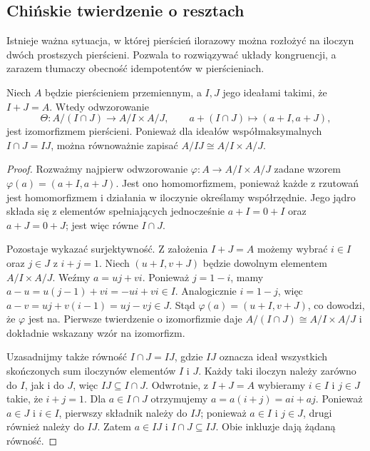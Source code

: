 \subsection{Chińskie twierdzenie o resztach}

Istnieje ważna sytuacja, w której pierścień ilorazowy można rozłożyć
na iloczyn dwóch prostszych pierścieni. Pozwala to rozwiązywać układy
kongruencji, a zarazem tłumaczy obecność idempotentów w pierścieniach.

\begin{twierdzenie}
\label{tw:crt}
Niech $A$ będzie pierścieniem przemiennym, a $I,J$ jego ideałami
takimi, że $I+J=A$. Wtedy odwzorowanie
\[
 \Theta\colon A/(I\cap J)\longrightarrow A/I\times A/J,\qquad
 a+(I\cap J)\longmapsto(a+I,a+J),
\]
jest izomorfizmem pierścieni. Ponieważ dla ideałów współmaksymalnych
$I\cap J=IJ$, można równoważnie zapisać $A/IJ\cong A/I\times A/J$.
\end{twierdzenie}
\begin{proof}
Rozważmy najpierw odwzorowanie
$\varphi\colon A\to A/I\times A/J$ zadane wzorem
$\varphi(a)=(a+I,a+J)$. Jest ono homomorfizmem, ponieważ każde
z rzutowań jest homomorfizmem i działania w iloczynie określamy
współrzędnie. Jego jądro składa się z elementów spełniających
jednocześnie $a+I=0+I$ oraz $a+J=0+J$; jest więc równe $I\cap J$.

Pozostaje wykazać surjektywność. Z założenia $I+J=A$ możemy wybrać
$i\in I$ oraz $j\in J$ z $i+j=1$.
Niech $(u+I,v+J)$ będzie dowolnym elementem $A/I\times A/J$.
Weźmy $a=uj+vi$. Ponieważ $j=1-i$, mamy
$a-u=u(j-1)+vi=-ui+vi\in I$.
Analogicznie $i=1-j$, więc
$a-v=uj+v(i-1)=uj-vj\in J$.
Stąd $\varphi(a)=(u+I,v+J)$, co dowodzi, że $\varphi$ jest na.
Pierwsze twierdzenie o izomorfizmie daje
$A/(I\cap J)\cong A/I\times A/J$ i dokładnie wskazany wzór na izomorfizm.

Uzasadnijmy także równość $I\cap J=IJ$, gdzie $IJ$ oznacza
ideał wszystkich skończonych sum iloczynów elementów $I$ i $J$.
Każdy taki iloczyn należy zarówno do $I$, jak i do $J$,
więc $IJ\subseteq I\cap J$.
Odwrotnie, z $I+J=A$ wybieramy $i\in I$ i $j\in J$
takie, że $i+j=1$. Dla $a\in I\cap J$ otrzymujemy
$a=a(i+j)=ai+aj$. Ponieważ $a\in J$ i $i\in I$,
pierwszy składnik należy do $IJ$; ponieważ $a\in I$ i $j\in J$,
drugi również należy do $IJ$. Zatem $a\in IJ$ i
$I\cap J\subseteq IJ$. Obie inkluzje dają żądaną równość.
\end{proof}

